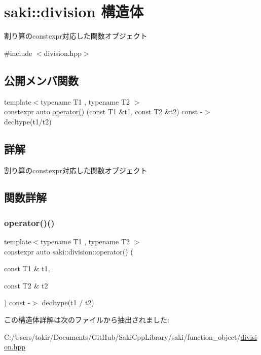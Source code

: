 \hypertarget{structsaki_1_1division}{}\section{saki\+:\+:division 構造体}
\label{structsaki_1_1division}


割り算のconstexpr対応した関数オブジェクト  




{\ttfamily \#include $<$division.\+hpp$>$}

\subsection*{公開メンバ関数}
\begin{DoxyCompactItemize}
\item 
{\footnotesize template$<$typename T1 , typename T2 $>$ }\\constexpr auto \mbox{\hyperlink{structsaki_1_1division_a54652339884419a0b696265b17b32705}{operator()}} (const T1 \&t1, const T2 \&t2) const -\/$>$ decltype(t1/t2)
\end{DoxyCompactItemize}


\subsection{詳解}
割り算のconstexpr対応した関数オブジェクト 

\subsection{関数詳解}
\mbox{\label{structsaki_1_1division_a54652339884419a0b696265b17b32705}} 
\subsubsection{\texorpdfstring{operator()()}{operator()()}}
{\footnotesize\ttfamily template$<$typename T1 , typename T2 $>$ \\
constexpr auto saki\+::division\+::operator() (\begin{DoxyParamCaption}\item[{const T1 \&}]{t1,  }\item[{const T2 \&}]{t2 }\end{DoxyParamCaption}) const -\/$>$ decltype(t1 / t2)
	\hspace{0.3cm}{\ttfamily [inline]}}



この構造体詳解は次のファイルから抽出されました\+:\begin{DoxyCompactItemize}
\item 
C\+:/\+Users/tokir/\+Documents/\+Git\+Hub/\+Saki\+Cpp\+Library/saki/function\+\_\+object/\mbox{\hyperlink{division_8hpp}{division.\+hpp}}\end{DoxyCompactItemize}
